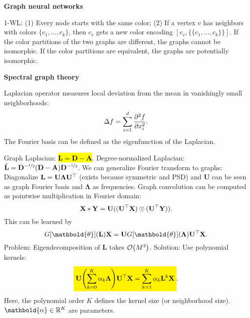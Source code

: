 \documentclass[10pt]{article}
\newenvironment{topic}[1]
{\textbf{\sffamily \footnotesize \colorbox{black}{\rlap{\textbf{\textcolor{white}{#1}}}\hspace{\linewidth}\hspace{-2\fboxsep}}}}
{}
\newenvironment{subtopic}[1]
{\begin{center}\textbf{\footnotesize \sffamily #1}\end{center}}
{}
\renewcommand{\mat}[1]{\ensuremath{\mathbf{#1}}}
\renewcommand{\vec}[1]{\ensuremath{\mathbold{#1}}}
\begin{document}
\begin{multicols*}{3}
\begin{topic}{Geometric deep learning}
\begin{subtopic}{Graph neural networks}
            1-WL: (1) Every node starts with the same color; (2) If a vertex $v$ has neighbors with
            colors $\{ c_1, \ldots, c_k \}$, then $c_v$ gets a new color encoding $[c_v, \{\{ c_1,
            \ldots, c_k \}\}]$. If the color partitions of the two graphs are different, the graphs
            cannot be isomorphic. If the color partitions are equivalent, the graphs are potentially
            isomorphic.
        \end{subtopic}

        \begin{subtopic}{Spectral graph theory}
            Laplacian operator measures local deviation from the mean in vanishingly small neighborhoods: \[
                \Delta f = \sum_{i=1}^{d} \pdv[order=2]{f}{x_i}.
            \]
            The Fourier basis can be defined as the eigenfunction of the Laplacian.

            Graph Laplacian: \hl{$\mat{L} = \mat{D} - \mat{A}$}. Degree-normalized Laplacian: $\tilde{\mat{L}} =
                \mat{D}^{-\nicefrac{1}{2}} (\mat{D} - \mat{A}) \mat{D}^{-\nicefrac{1}{2}}$. We can generalize
            Fourier transform to graphs: Diagonalize $\mat{L} = \mat{U} \mat{\Lambda} \transpose{\mat{U}}$
            (exists because symmetric and PSD) and $\mat{U}$ can be seen as graph Fourier basis and
            $\mat{\Lambda}$ as frequencies. Graph convolution can be computed as pointwise multiplication in
            Fourier domain: \[
                \mat{X} * \mat{Y} = \mat{U}((\transpose{\mat{U}}\mat{X}) \odot (\transpose{\mat{U}} \mat{Y})).
            \]
            This can be learned by \[
                G[\vec{\theta}](\mat{L}) \mat{X} = \mat{U} G[\vec{\theta}](\mat{\Lambda}) \transpose{\mat{U}} \mat{X}.
            \]
            Problem: Eigendecomposition of $\mat{L}$ takes $\bigo{M^3}$. Solution: Use polynomial kernels: \[
                \colorbox{yellow}{$\displaystyle \mat{U} \lft( \sum_{k=0}^{K} \alpha_k \mat{\Lambda} \rgt) \transpose{\mat{U}} \mat{X} = \sum_{k=1}^{K} \alpha_k \mat{L}^k \mat{X}$}.
            \]
            Here, the polynomial order $K$ defines the kernel size (or neighborhood size). $\vec{\alpha} \in
                \R^K$ are parameters.
        \end{subtopic}

    \end{topic}

    \begin{topic}{Tricks of the trade}


\end{topic}
\end{multicols*}
\end{document}
